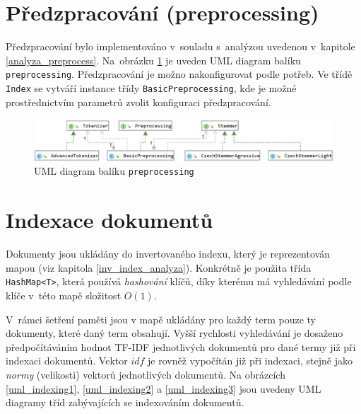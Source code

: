 \documentclass[
11pt,
a4paper,
pdftex,
czech,
titlepage
]{report}
\begin{document}
\section{Předzpracování (preprocessing)}
Předzpracování bylo implementováno v~souladu s~analýzou uvedenou v~kapitole \ref{analyza_preprocess}. Na~obrázku \ref{uml_preprocess} je uveden UML diagram balíku \texttt{preprocessing}. Předzpracování je možno nakonfigurovat podle potřeb. Ve třídě \texttt{Index} se vytváří instance třídy \texttt{BasicPreprocessing}, kde je možné prostřednictvím parametrů zvolit konfiguraci předzpracování.

\begin{figure}[!ht]
	\centering
	\includegraphics[width=1\textwidth]{img/preprocessing.png}
	\caption{UML diagram balíku \texttt{preprocessing}}
	\label{uml_preprocess}
\end{figure}

\section{Indexace dokumentů}
Dokumenty jsou ukládány do invertovaného indexu, který je reprezentován mapou (viz kapitola \ref{inv_index_analyza}). Konkrétně je použita třída \texttt{HashMap<T>}, která používá \textit{hashování} klíčů, díky kterému má vyhledávání podle klíče v~této mapě složitost $O(1)$. 

V~rámci šetření paměti jsou v mapě ukládány pro každý term pouze ty dokumenty, které daný term obsahují. Vyšší rychlosti vyhledávání je dosaženo předpočítáváním hodnot TF-IDF jednotlivých dokumentů pro dané termy již při indexaci dokumentů. Vektor $idf$ je rovněž vypočítán již při indexaci, stejně jako \textit{normy} (velikosti) vektorů jednotlivých dokumentů. Na obrázcích \ref{uml_indexing1}, \ref{uml_indexing2} a \ref{uml_indexing3} jsou uvedeny UML diagramy tříd zabývajících se indexováním dokumentů.
\end{document}
